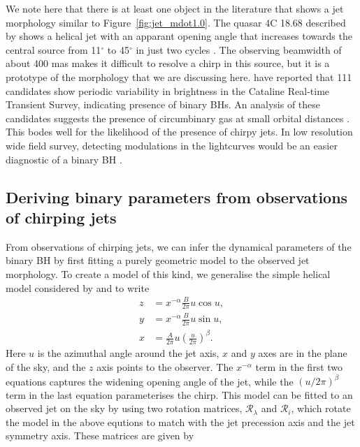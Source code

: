\documentclass[a4paper,fleqn,usenatbib]{mnras}
\begin{document}
We note here that there is at least one object in the literature that
shows a jet morphology similar to Figure~\ref{fig:jet_mdot1.0}.  The
quasar 4C 18.68 described by \citet{1982ApJ...253L...1G} shows a
helical jet with an apparant opening angle that increases towards the
central source from 11$^\circ$ to 45$^\circ$ in just two cycles
\citet{1982ApJ...262..478G}.  The observing beamwidth of about 400 mas
makes it difficult to resolve a chirp in this source, but it is a
prototype of the morphology that we are discussing here.
\citet{2015MNRAS.453.1562G} have reported that 111 candidates show
periodic variability in brightness in the Cataline Real-time Transient
Survey, indicating presence of binary BHs.  An analysis of these
candidates suggests the presence of circumbinary gas at small orbital
distances \citep{2015MNRAS.453.1562G}.  This bodes well for the
likelihood of the presence of chirpy jets.  In low resolution wide
field survey, detecting modulations in the lightcurves would be an
easier diagnostic of a binary BH \citep{2011ApJ...743..136O,
  2011ApJ...734L..37K}.

\subsection{Deriving binary parameters from observations of chirping jets}

From observations of chirping jets, we can infer the dynamical
parameters of the binary BH by first fitting a purely geometric model
to the observed jet morphology.  To create a model of this kind, we
generalise the simple helical model considered by
\citet{2014MNRAS.445.1370K} and \citet{2001NewA....6...61N} to write
\begin{align}
  z &= x^{-\alpha} \frac{B}{2\pi} u \cos{u}, \\
  y &= x^{-\alpha} \frac{B}{2\pi} u \sin{u}, \\
  x &= \frac{A}{2\pi} u \left(\frac{u}{2\pi}\right)^\beta.
\end{align}
Here $u$ is the azimuthal angle around the jet axis, $x$ and $y$ axes
are in the plane of the sky, and the $z$ axis points to the observer.
The $x^{-\alpha}$ term in the first two equations captures the
widening opening angle of the jet, while the $(u/2\pi)^{\beta}$ term
in the last equation parameterises the chirp.  This model can be
fitted to an observed jet on the sky by using two rotation matrices,
$\mathcal{R}_\lambda$ and $\mathcal{R}_i$, which rotate the model in
the above equtions to match with the jet precession axis and the jet
symmetry axis.  These matrices are given by
\end{document}

